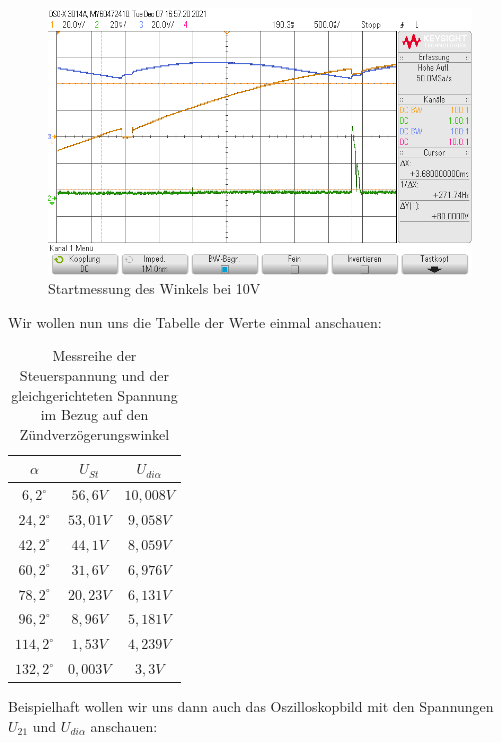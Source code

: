 \documentclass{article}
\begin{document}
\begin{figure}[h]
  \centering
  \includegraphics[width=\textwidth]{../assets/images/GEP2/startAngle.png}
  \caption{Startmessung des Winkels bei 10V}
  \label{fig:startAngle}
\end{figure}

\newpage

Wir wollen nun uns die Tabelle der Werte einmal anschauen:

\begin{table}[h]
  \centering
  \begin{tabular}{|c|c|c|}
    \hline
    $\alpha$ & $U_{St}$ & $U_{di\alpha}$ \\
    \hline
    $6,2^{\circ}$ & $56,6V$ & $10,008V$\\
    \hline
    $24,2^{\circ}$ &$53,01V$ & $9,058V$\\
    \hline
    $42,2^{\circ}$ &$44,1V$ & $8,059V$\\
    \hline
    $60,2^{\circ}$ & $31,6V$& $6,976V$\\
    \hline
    $78,2^{\circ}$ & $20,23V$& $6,131V$\\
    \hline
    $96,2^{\circ}$ & $8,96V$& $5,181V$\\
    \hline
    $114,2^{\circ}$ &$1,53V$ & $4,239V$\\
    \hline
    $132,2^{\circ}$ & $0,003V$& $3,3V$\\
    \hline
  \end{tabular}
  \caption{Messreihe der Steuerspannung und der gleichgerichteten Spannung im Bezug auf den Zündverzögerungswinkel}
  \label{tab:mess1}
\end{table}

Beispielhaft wollen wir uns dann auch das Oszilloskopbild mit den Spannungen $U_{21}$ und $U_{di\alpha}$ anschauen:
\end{document}
